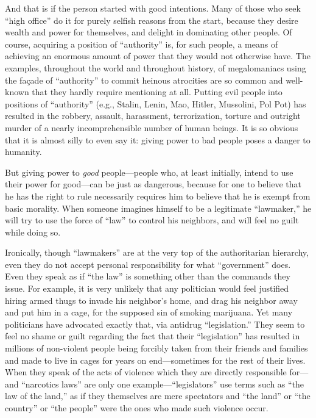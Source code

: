 \documentclass{book}
\begin{document}
And that is if the person started with good intentions. Many of those who seek \enquote{high office} do it for purely selfish reasons from the start, because they desire wealth and power for themselves, and delight in dominating other people. Of course, acquiring a position of \enquote{authority} is, for such people, a means of achieving an enormous amount of power that they would not otherwise have. The examples, throughout the world and throughout history, of megalomaniacs using the façade of \enquote{authority} to commit heinous atrocities are so common and well-known that they hardly require mentioning at all. Putting evil people into positions of \enquote{authority} (e.g., Stalin, Lenin, Mao, Hitler, Mussolini, Pol Pot) has resulted in the robbery, assault, harassment, terrorization, torture and outright murder of a nearly incomprehensible number of human beings. It is so obvious that it is almost silly to even say it: giving power to bad people poses a danger to humanity.

But giving power to \emph{good} people---people who, at least initially, intend to use their power for good---can be just as dangerous, because for one to believe that he has the right to rule necessarily requires him to believe that he is exempt from basic morality. When someone imagines himself to be a legitimate \enquote{lawmaker,} he will try to use the force of \enquote{law} to control his neighbors, and will feel no guilt while doing so.

Ironically, though \enquote{lawmakers} are at the very top of the authoritarian hierarchy, even they do not accept personal responsibility for what \enquote{government} does. Even they speak as if \enquote{the law} is something other than the commands they issue. For example, it is very unlikely that any politician would feel justified hiring armed thugs to invade his neighbor's home, and drag his neighbor away and put him in a cage, for the supposed sin of smoking marijuana. Yet many politicians have advocated exactly that, via antidrug \enquote{legislation.} They seem to feel no shame or guilt regarding the fact that their \enquote{legislation} has resulted in millions of non-violent people being forcibly taken from their friends and families and made to live in cages for years on end---sometimes for the rest of their lives. When they speak of the acts of violence which they are directly responsible for---and \enquote{narcotics laws} are only one example---\enquote{legislators} use terms such as \enquote{the law of the land,} as if they themselves are mere spectators and \enquote{the land} or \enquote{the country} or \enquote{the people} were the ones who made such violence occur.
\end{document}
